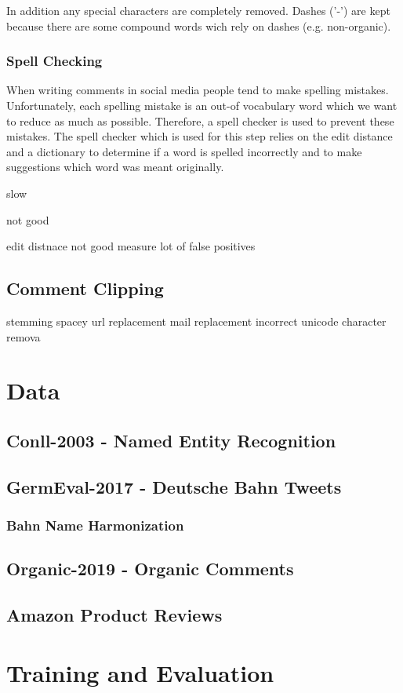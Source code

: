 In addition any special characters are completely removed. Dashes ('-') are kept because there are some compound words wich rely on dashes (e.g. non-organic).

\subsubsection*{Spell Checking}
When writing comments in social media people tend to make spelling mistakes. Unfortunately, each spelling mistake is an out-of vocabulary word which we want to reduce as much as possible.
Therefore, a spell checker is used to prevent these mistakes. The spell checker which is used for this step relies on the edit distance and a dictionary to determine if a word is spelled incorrectly and to make suggestions which word was meant originally. 

slow

not good

edit distnace not good measure
lot of false positives



\subsection{Comment Clipping}

stemming
spacey 
url replacement
mail replacement
incorrect unicode character remova



\section{Data}
\label{sec:Data}


\subsection{Conll-2003 - Named Entity Recognition}
\subsection{GermEval-2017 - Deutsche Bahn Tweets}
\subsubsection*{Bahn Name Harmonization}
\subsection{Organic-2019 - Organic Comments}
\subsection{Amazon Product Reviews}






\section{Training and Evaluation}